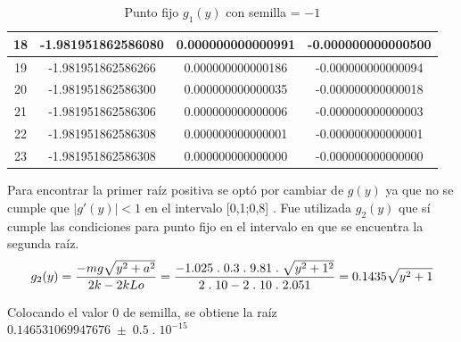 \documentclass[10pt,a4paper]{article}
\begin{document}
\begin{table}[H]
{\begin{tabular}{|c|c|c|c|}
\hline 18 & -1.981951862586080 & 0.000000000000991 & -0.000000000000500 \\
\hline 19 & -1.981951862586266 & 0.000000000000186 & -0.000000000000094 \\
\hline 20 & -1.981951862586300 & 0.000000000000035 & -0.000000000000018 \\
\hline 21 & -1.981951862586306 & 0.000000000000006 & -0.000000000000003 \\
\hline 22 & -1.981951862586308 & 0.000000000000001 & -0.000000000000001 \\
\hline 23 & -1.981951862586308 & 0.000000000000000 & -0.000000000000000 \\
\hline
\end{tabular}}
\caption{Punto fijo $g_{1}(y)$ con semilla = $-1$}
\end{table}

Para encontrar la primer raíz positiva se optó por cambiar de $g(y)$ ya que no se cumple que $|g'(y)|<1$ en el intervalo [0,1;0,8] . Fue utilizada $g_{2}(y)$ que sí cumple las condiciones para punto fijo en el intervalo en que se encuentra la segunda raíz.\\

\begin{equation}
\notag g_{2}(y)=\dfrac{-mg\sqrt{y^{2}+a^{2}}} { 2k-2kLo} = \dfrac{-1.025\;.\;0.3\;.\;9.81\;.\;\sqrt{y^{2}+1^{2}}} { 2\;.\;10-2\;.\;10\;.\;2.051} = 0.1435\sqrt{y^{2}+1}\\
\end{equation}

Colocando el valor $0$ de semilla, se obtiene la raíz $0.146531069947676\; \pm\; 0.5\;.\;10^{-15}$
\end{document}
